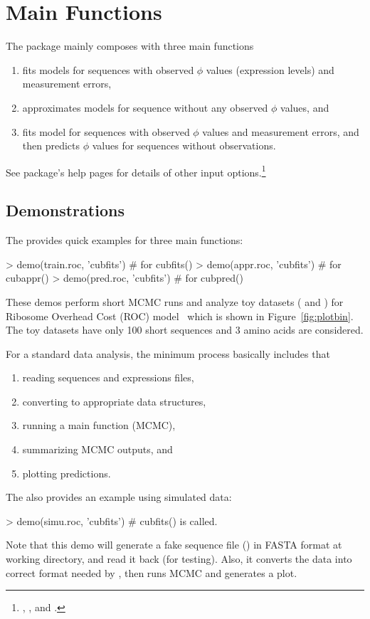 
\section[Main Functions]{Main Functions}
\label{sec:main_functions}

The  package mainly composes with three main functions
\begin{enumerate}
\item {} fits models for sequences with observed $\phi$ values
      (expression levels) and measurement errors,
\item {} approximates models for sequence without any observed
      $\phi$ values, and
\item {} fits model for sequences with observed $\phi$ values
      and measurement errors, and then predicts $\phi$ values for sequences
      without observations.
\end{enumerate}
See package's help pages for details of other input options.\footnote{
, , and
.
}


\subsection[Demonstrations]{Demonstrations}
\label{sec:demonstrtions}

The  provides quick examples for three main functions:
\begin{Code}
> demo(train.roc, 'cubfits')    # for cubfits()
> demo(appr.roc, 'cubfits')     # for cubappr()
> demo(pred.roc, 'cubfits')     # for cubpred()
\end{Code}
These  demos perform short MCMC runs
and analyze toy datasets ( and ) for
Ribosome Overhead Cost (ROC) model~\citep{Shah2011}
which is shown in Figure~\ref{fig:plotbin}. The toy datasets have only 100
short sequences and 3 amino acids are considered.

For a standard data analysis, the minimum process basically includes that
\begin{enumerate}
\item reading sequences and expressions files,
\item converting to appropriate data structures,
\item running a main function (MCMC),
\item summarizing MCMC outputs, and
\item plotting predictions.
\end{enumerate}
The  also provides an example using simulated data:
\begin{Code}
> demo(simu.roc, 'cubfits')     # cubfits() is called.
\end{Code}
Note that this demo will generate a fake sequence file ()
in FASTA format at working directory, and
read it back (for testing). Also, it converts the data into correct format
needed by , then runs MCMC and generates a plot.


